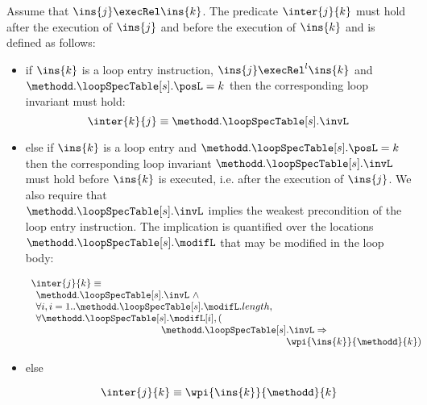 \begin{defInter}\label{inter} 

Assume that $\ins{j} \execRel \ins{k}$. The predicate $\inter{j}{k}$ must hold after the execution of $\ins{j}$ and before the execution of 
$\ins{k}$ and is defined as follows:
\begin{itemize}
\item if $\ins{k}$ is a loop entry instruction,  $\ins{j} \execRel^l \ins{k}$ and  $ \methodd.\loopSpecTable[s].\posL = k $
then the corresponding loop invariant  must hold:
$$
\inter{k}{j} \equiv  \methodd.\loopSpecTable[s].\invL
$$


\item else if $\ins{k}$  is a loop entry  and  $ \methodd.\loopSpecTable[s].\posL = k $ 
then the corresponding loop invariant $ \methodd.\loopSpecTable[s].\invL$  must hold before $\ins{k}$ is executed, 
i.e. after the execution of $\ins{j}$. We also require that \\
$\methodd.\loopSpecTable[s].\invL$ implies the weakest precondition of the loop entry instruction. 
The implication is quantified over the locations $ \methodd.\loopSpecTable[s].\modifL $ that may be modified in the loop body:

$$\begin{array}{l} \inter{j}{k} \equiv \\ \begin{array}{l}
          \methodd.\loopSpecTable[s].\invL \ \wedge \\
          \forall i , i = 1.. \methodd.\loopSpecTable[s].\modifL.length ,\\
          \forall  \methodd.\loopSpecTable[s].\modifL[i], (\\
	  \phantom{ \methodd.\loopSpecTable[s] }  \methodd.\loopSpecTable[s].\invL \Rightarrow \\
	  \phantom{ \methodd.\loopSpecTable[s]  \methodd.\loopSpecTable[s] } \wpi{\ins{k}}{ \methodd }{k} ) 
 \end{array}
 \end{array}  $$

\item else 

$$\inter{j}{k} \equiv \wpi{ \ins{k }}{\methodd}{k}$$
\end{itemize}
\end{defInter}
